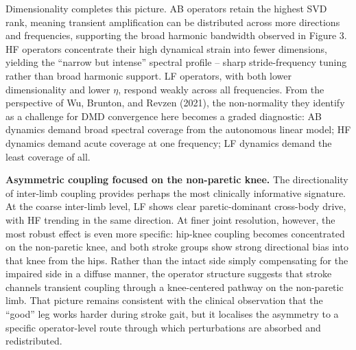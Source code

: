 \documentclass[
  letterpaper,
  DIV=11,
  numbers=noendperiod]{scrartcl}
\begin{document}
Dimensionality completes this picture. AB operators retain the highest
SVD rank, meaning transient amplification can be distributed across more
directions and frequencies, supporting the broad harmonic bandwidth
observed in Figure 3. HF operators concentrate their high dynamical
strain into fewer dimensions, yielding the ``narrow but intense''
spectral profile -- sharp stride-frequency tuning rather than broad
harmonic support. LF operators, with both lower dimensionality and lower
\(\eta\), respond weakly across all frequencies. From the perspective of
Wu, Brunton, and Revzen (2021), the non-normality they identify as a
challenge for DMD convergence here becomes a graded diagnostic: AB
dynamics demand broad spectral coverage from the autonomous linear
model; HF dynamics demand acute coverage at one frequency; LF dynamics
demand the least coverage of all.

\textbf{Asymmetric coupling focused on the non-paretic knee.} The
directionality of inter-limb coupling provides perhaps the most
clinically informative signature. At the coarse inter-limb level, LF
shows clear paretic-dominant cross-body drive, with HF trending in the
same direction. At finer joint resolution, however, the most robust
effect is even more specific: hip-knee coupling becomes concentrated on
the non-paretic knee, and both stroke groups show strong directional
bias into that knee from the hips. Rather than the intact side simply
compensating for the impaired side in a diffuse manner, the operator
structure suggests that stroke channels transient coupling through a
knee-centered pathway on the non-paretic limb. That picture remains
consistent with the clinical observation that the ``good'' leg works
harder during stroke gait, but it localises the asymmetry to a specific
operator-level route through which perturbations are absorbed and
redistributed.
\end{document}
